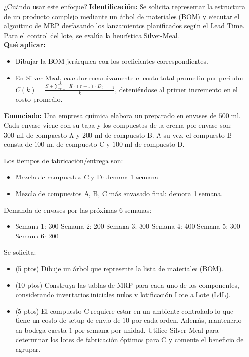 \documentclass[11pt, a4paper]{article}
\begin{document}
  \begin{tipprueba}{¿Cuándo usar este enfoque?}
    \textbf{Identificación:} Se solicita representar la estructura de un producto complejo mediante un árbol de materiales (BOM) y ejecutar el algoritmo de MRP desfasando los lanzamientos planificados según el Lead Time. Para el control del lote, se evalúa la heurística Silver-Meal.\\
    \textbf{Qué aplicar:}
    \begin{itemize}
      \item Dibujar la BOM jerárquica con los coeficientes correspondientes.
      \item En Silver-Meal, calcular recursivamente el costo total promedio por periodo: $C(k) = \frac{S + \sum_{r=1}^{k} H \cdot (r-1) \cdot D_{t+r-1}}{k}$, deteniéndose al primer incremento en el costo promedio.
    \end{itemize}
  \end{tipprueba}

  \textbf{Enunciado:}
  Una empresa química elabora un preparado en envases de $500\text{ ml}$. Cada envase viene con su tapa y los compuestos de la crema por envase son: $300\text{ ml}$ de compuesto A y $200\text{ ml}$ de compuesto B. A su vez, el compuesto B consta de $100\text{ ml}$ de compuesto C y $100\text{ ml}$ de compuesto D.

  Los tiempos de fabricación/entrega son:
  \begin{itemize}
    \item Mezcla de compuestos C y D: demora 1 semana.
    \item Mezcla de compuestos A, B, C más envasado final: demora 1 semana.
  \end{itemize}
  
  Demanda de envases por las próximas 6 semanas:
  \begin{itemize}
    \item Semana 1: 300 \quad Semana 2: 200 \quad Semana 3: 300 \quad Semana 4: 400 \quad Semana 5: 300 \quad Semana 6: 200
  \end{itemize}

  Se solicita:
  \begin{itemize}
    \item[\textbf{i.}] (5 ptos) Dibuje un árbol que represente la lista de materiales (BOM).
    \item[\textbf{ii.}] (10 ptos) Construya las tablas de MRP para cada uno de los componentes, considerando inventarios iniciales nulos y lotificación Lote a Lote (L4L).
    \item[\textbf{iii.}] (5 ptos) El compuesto C requiere estar en un ambiente controlado lo que tiene un costo de setup de envío de $10$ por cada orden. Además, mantenerlo en bodega cuesta $1$ por semana por unidad. Utilice Silver-Meal para determinar los lotes de fabricación óptimos para C y comente el beneficio de agrupar.
  \end{itemize}
\end{document}
